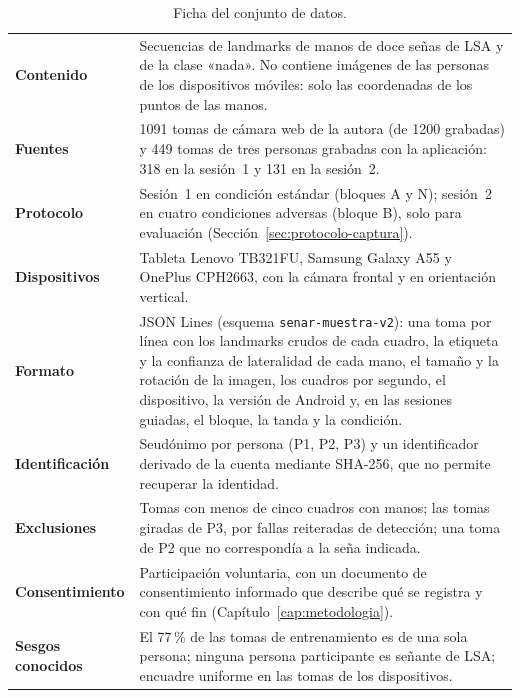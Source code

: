 \begin{table}[h]
    \centering
    \small
    \begin{tabular}{p{4cm}p{10cm}}
        \toprule
        \textbf{Contenido} & Secuencias de landmarks de manos de doce señas de LSA y de la clase «nada». No contiene imágenes de las personas de los dispositivos móviles: solo las coordenadas de los puntos de las manos. \\
        \textbf{Fuentes} & 1091 tomas de cámara web de la autora (de 1200 grabadas) y 449 tomas de tres personas grabadas con la aplicación: 318 en la sesión~1 y 131 en la sesión~2. \\
        \textbf{Protocolo} & Sesión~1 en condición estándar (bloques A y N); sesión~2 en cuatro condiciones adversas (bloque B), solo para evaluación (Sección~\ref{sec:protocolo-captura}). \\
        \textbf{Dispositivos} & Tableta Lenovo TB321FU, Samsung Galaxy A55 y OnePlus CPH2663, con la cámara frontal y en orientación vertical. \\
        \textbf{Formato} & JSON Lines (esquema \texttt{senar-muestra-v2}): una toma por línea con los landmarks crudos de cada cuadro, la etiqueta y la confianza de lateralidad de cada mano, el tamaño y la rotación de la imagen, los cuadros por segundo, el dispositivo, la versión de Android y, en las sesiones guiadas, el bloque, la tanda y la condición. \\
        \textbf{Identificación} & Seudónimo por persona (P1, P2, P3) y un identificador derivado de la cuenta mediante SHA-256, que no permite recuperar la identidad. \\
        \textbf{Exclusiones} & Tomas con menos de cinco cuadros con manos; las tomas giradas de P3, por fallas reiteradas de detección; una toma de P2 que no correspondía a la seña indicada. \\
        \textbf{Consentimiento} & Participación voluntaria, con un documento de consentimiento informado que describe qué se registra y con qué fin (Capítulo~\ref{cap:metodologia}). \\
        \textbf{Sesgos conocidos} & El 77\,\% de las tomas de entrenamiento es de una sola persona; ninguna persona participante es señante de LSA; encuadre uniforme en las tomas de los dispositivos. \\
        \bottomrule
    \end{tabular}
    \caption{Ficha del conjunto de datos.}
    \label{tab:ficha-datos}
\end{table}

